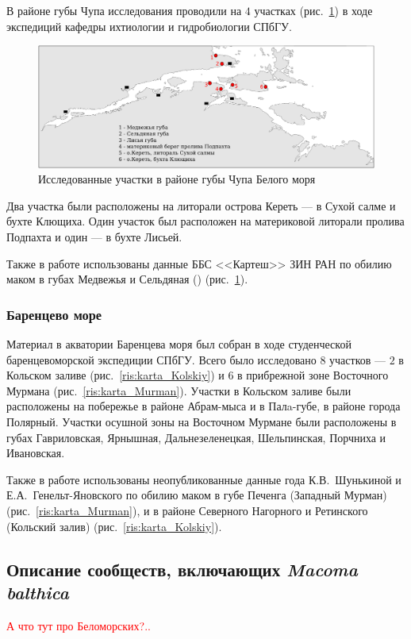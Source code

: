 В районе губы Чупа исследования проводили на $4$ участках (рис.~\ref{ris:karta_Chupa}) в ходе экспедиций кафедры ихтиологии и гидробиологии СПбГУ. 
\begin{figure}
    \includegraphics[width=\textwidth]{../maps/map_Chupa.pdf}
    \caption{Исследованные участки в районе губы Чупа Белого моря}
    \label{ris:karta_Chupa}
\end{figure}
Два участка были расположены на литорали острова Кереть --- в Сухой салме и бухте Клющиха. 
Один участок был расположен на материковой литорали пролива Подпахта и один --- в бухте Лисьей.

Также в работе использованы данные ББС <<Картеш>> ЗИН РАН по обилию маком в губах Медвежья и Сельдяная (\textcite{Varfolomeev_aNaumov_2013}) (рис.~\ref{ris:karta_Chupa}).

		\subsubsection{Баренцево море}
Материал  в акватории Баренцева моря  был  собран    в ходе   студенческой баренцевоморской экспедиции СПбГУ. 
Всего было исследовано $8$ участков --- $2$ в Кольском заливе (рис.~\ref{ris:karta_Kolskiy})   и   $6$  в   прибрежной   зоне  Восточного  Мурмана (рис.~\ref{ris:karta_Murman}).  
Участки   в   Кольском   заливе   были  расположены на побережье в районе Абрам-мыса и в Палa-губе, в районе города Полярный. 
Участки  осушной   зоны  на   Восточном   Мурмане   были   расположены   в   губах   Гавриловская,  Ярнышная, Дальнезеленецкая, Шельпинская, Порчниха и Ивановская.

Также в работе использованы неопубликованные данные года К.\:В.~Шунькиной и Е.\:А.~Генельт-Яновского по обилию маком в губе Печенга (Западный Мурман) (рис.~\ref{ris:karta_Murman}), и в районе Северного Нагорного и Ретинского (Кольский залив) (рис.~\ref{ris:karta_Kolskiy}).

    \subsection{Описание сообществ, включающих {\it Macoma balthica}}
\textcolor{red}{А что тут про Беломорских?..}

